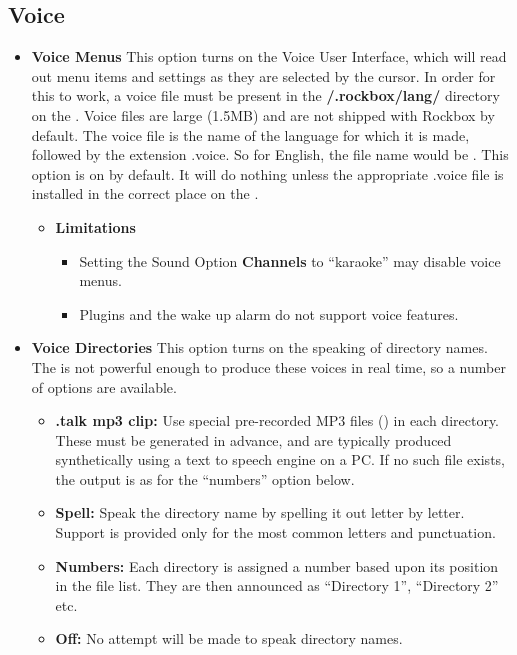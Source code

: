    \subsection{\label{ref:Voiceconfiguration}Voice}
  
  \begin{itemize}
  \item \textbf{Voice Menus}
    This option turns on the Voice User Interface, which will read out menu items and settings as they are selected by the cursor.  In order for this to work, a voice file must be present in the \textbf{/.rockbox/lang/} directory on the \dap.  Voice files are large (1.5MB) and are not shipped with Rockbox by default.
    The voice file is the name of the language for which it is made, followed by the extension .voice.  So for English, the file name would be .
    This option is on by default.  It will do nothing unless the appropriate .voice file is installed in the correct place on the \dap.
    \begin{itemize}
    \item \textbf{Limitations}
      \begin{itemize}
      \item Setting the Sound Option \textbf{Channels} to ``karaoke'' may disable voice menus.
      \item Plugins and the wake up alarm do not support voice features.
      \end{itemize}
  	\end{itemize}
    
  \item \textbf{Voice Directories}
    This option turns on the speaking of directory names.  The \dap is not powerful enough to produce these voices in real time, so a number of options are available.
    \begin{itemize}
    \item \textbf{.talk mp3 clip: }
      Use special pre{}-recorded MP3 files () in each directory.  These must be generated in advance, and are typically produced synthetically using a text to speech engine on a PC.  If no such file exists, the output is as for the ``numbers'' option below.
    \item \textbf{Spell: }
      Speak the directory name by spelling it out letter by letter.  Support is provided only for the most common letters and punctuation.
    \item \textbf{Numbers: }
      Each directory is assigned a number based upon its position in the file list.  They are then announced as ``Directory 1'', ``Directory 2'' etc.
    \item \textbf{Off: }
      No attempt will be made to speak directory names.
    \end{itemize}
    

\end{itemize}
